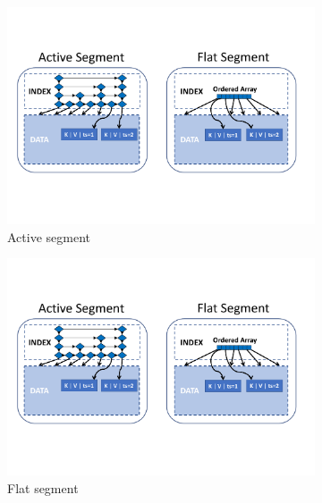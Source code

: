 \begin{figure}[tb]

  \centering
  
  \begin{subfigure}[t]{0.5\columnwidth}
      \includegraphics[width=\figw]{active-seg.pdf}
      \caption[]{Active segment}
    \label{fig:flattening:active}  
  \end{subfigure}   
  \begin{subfigure}[t]{0.5\columnwidth}
      \includegraphics[width=\figw]{flat-seg.pdf}
      \caption[]{Flat segment}
    \label{fig:flattening:flat}
  \end{subfigure}
  \begin{subfigure}[t]{0.5\columnwidth}

\end{subfigure}
\end{figure}
